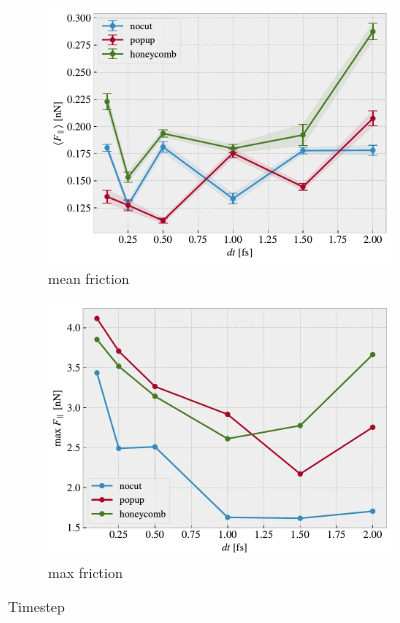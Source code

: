 \begin{figure}[H]
  \centering
  \begin{subfigure}[b]{0.49\textwidth}
      \centering
      \includegraphics[width=\textwidth]{figures/baseline/variables_dt_mean.pdf}
      \caption{mean friction}
      \label{fig:var_dt_mean}
  \end{subfigure}
  \hfill
  \begin{subfigure}[b]{0.49\textwidth}
      \centering
      \includegraphics[width=\textwidth]{figures/baseline/variables_dt_max.pdf}
      \caption{max friction}
      \label{fig:var_dt_max}
  \end{subfigure}
  \hfill
     \caption{Timestep}
     \label{fig:var_dt}
\end{figure}

